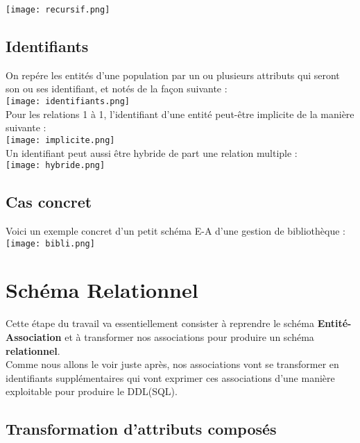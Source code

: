 \documentclass{report}
\begin{document}
				\texttt{[image: recursif.png]}

		\subsection{Identifiants}

			On repére les entités d'une population par un ou plusieurs attributs qui seront son ou ses identifiant, et notés de la façon suivante :\\

			\texttt{[image: identifiants.png]}\\

			Pour les relations 1 à 1, l'identifiant d'une entité peut-être implicite de la manière suivante : \\

			\texttt{[image: implicite.png]}\\

			Un identifiant peut aussi être hybride de part une relation multiple : \\

			\texttt{[image: hybride.png]}\\

		\subsection{Cas concret}

			Voici un exemple concret d'un petit schéma E-A d'une gestion de bibliothèque : \\

			\texttt{[image: bibli.png]}\\


	\section{Schéma Relationnel}

		Cette étape du travail va essentiellement consister à reprendre le schéma \textbf{Entité-Association} et à transformer nos associations pour produire un schéma \textbf{relationnel}.\\
		Comme nous allons le voir juste après, nos associations vont se transformer en identifiants supplémentaires qui vont exprimer ces associations d'une manière exploitable pour produire le DDL(SQL).\\

		\subsection{Transformation d'attributs composés}
\end{document}
